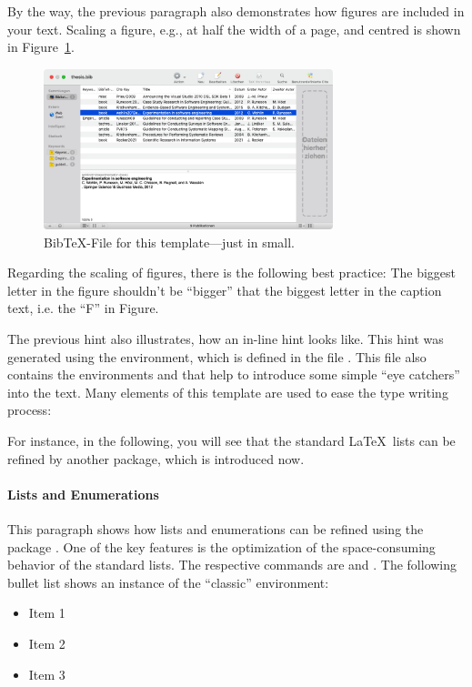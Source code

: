 By the way, the previous paragraph also demonstrates how figures are included in your text. Scaling a figure, e.g., at half the width of a page, and centred is shown in Figure~\ref{fig:bibtex2}.

\begin{figure}[htbp]
	\centering
	\includegraphics[width=0.75\textwidth]{figs/bibtex.png}
	\caption[Alternative Text]{BibTeX-File for this template---just in small.}
	\label{fig:bibtex2}
\end{figure}

\begin{MySugg}
	Regarding the scaling of figures, there is the following best practice: The biggest letter in the figure shouldn't be ``bigger'' that the biggest letter in the caption text, i.e. the ``F'' in Figure.
\end{MySugg}

The previous hint also illustrates, how an in-line hint looks like. This hint was generated using the  environment, which is defined in the file . This file also contains the environments  and  that help to introduce some simple ``eye catchers'' into the text. Many elements of this template are used to ease the type writing process:

\begin{MySample}
	For instance, in the following, you will see that the standard \LaTeX\ lists can be refined by another package, which is introduced now.
\end{MySample}

\paragraph{Lists and Enumerations}
This paragraph shows how lists and enumerations can be refined using the package . One of the key features is the optimization of the space-consuming behavior of the standard lists. The respective commands are  and . The following bullet list shows an instance of the ``classic''  environment:
\begin{itemize}
	\item Item 1
	\item Item 2
	\item Item 3
\end{itemize}

